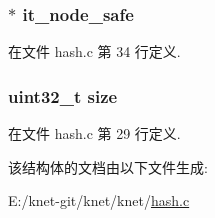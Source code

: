 \hypertarget{struct__hash__t_a6dfec4a7073d96287c5b03b35862f10a}{}
\subsubsection[{it\+\_\+node\+\_\+safe}]{$\ast$ it\+\_\+node\+\_\+safe}\label{struct__hash__t_a6dfec4a7073d96287c5b03b35862f10a}


在文件 hash.\+c 第 34 行定义.

\hypertarget{struct__hash__t_ab2c6b258f02add8fdf4cfc7c371dd772}{}
\subsubsection[{size}]{\setlength{\rightskip}{0pt plus 5cm}uint32\+\_\+t size}\label{struct__hash__t_ab2c6b258f02add8fdf4cfc7c371dd772}


在文件 hash.\+c 第 29 行定义.



该结构体的文档由以下文件生成\+:\begin{DoxyCompactItemize}
\item 
E\+:/knet-\/git/knet/knet/\hyperlink{hash_8c}{hash.\+c}\end{DoxyCompactItemize}
